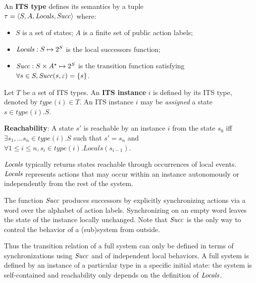 \begin{definition}
\label{def:ipntype}
An \textbf{ITS type} defines its semantics by a tuple\\
$\tau = \langle {S,A,\ensuremath{\mathit{Locals}}{},\ensuremath{\mathit{Succ}}{}} \rangle$ where:
\begin{itemize}
\item $S$ is a set of states;
$A$ is a finite set of public action labels;
\item $\mathit{Locals}{}: S \mapsto 2^S$ is the local successors function;
\item $\mathit{Succ}{}: S \times A^\star \mapsto 2^S$ is the transition function
satisfying $\forall s \in S, \mathit{Succ}{}(s,\varepsilon)=\{s\}$.
\end{itemize}
Let $T$ be a set of ITS types. An \textbf{ITS instance} $i$ is defined
by its ITS type, denoted by $\mathit{type}(i) \in T$. An ITS instance
$i$ may be \emph{assigned} a state $s \in \mathit{type}(i).S$.

\textbf{Reachability}: A state $s'$ is reachable by an instance $i$
from the state $s_0$ iff $\exists s_1,\ldots s_n \in
\mathit{type(i)}.S$ such that $s' = s_n$  and $\forall 1 \leq i \leq n, s_i
\in \mathit{type(i)}.Locals(s_{i-1})$.

\end{definition}

$\mathit{Locals}{}$ typically returns states reachable
through occurrences of local events. $\mathit{Locals}{}$ represents actions that may
occur within an instance autonomously or independently from the rest of the
system.

The function $\mathit{Succ}{}$ produces successors by explicitly synchronizing
actions via a word over the alphabet of action labels. Synchronizing on an
empty word leaves the state of the instance locally unchanged. Note that
$\mathit{Succ}{}$ is the only way to control the behavior of a (sub)system from
outside.

Thus the transition relation of a full system can only be defined in terms of
synchronizations using $\mathit{Succ}{}$ and of independent local behaviors. A full
system is defined by an instance of a particular type in a specific initial
state: the system is self-contained and reachability only depends on the
definition of $\mathit{Locals}{}$.
